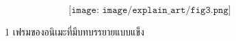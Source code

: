 \begin{figure}[h]
    \[
    \texttt{[image: image/explain\_art/fig3.png]}
    \]
    \caption{1 เฟรมของอนิเมะที่มีบทบรรยายแบบแข็ง}
    \label{figure:inpaint-anime-explain}
\end{figure}